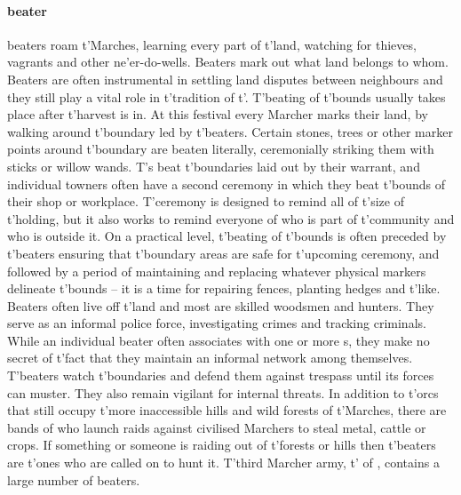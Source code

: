\paragraph{beater} beaters roam t'\allowbreak Marches, learning every part of t'\allowbreak land, watching for thieves, vagrants and other ne'er-do-wells. Beaters mark out what land belongs to whom.  Beaters are often instrumental in settling land disputes between neighbours and they still play a vital role in t'\allowbreak tradition of t'\allowbreak {}. T'beating of t'\allowbreak bounds usually takes place after t'\allowbreak harvest is in. At this festival every Marcher marks their land, by walking around t'\allowbreak boundary led by t'\allowbreak beaters. Certain stones, trees or other marker points around t'\allowbreak boundary are beaten literally, ceremonially striking them with sticks or willow wands. T's beat t'\allowbreak boundaries laid out by their warrant, and individual towners often have a second ceremony in which they beat t'\allowbreak bounds of their shop or workplace. T'ceremony is designed to remind all of t'\allowbreak size of t'\allowbreak holding, but it also works to remind everyone of who is part of t'\allowbreak community and who is outside it. On a practical level, t'\allowbreak beating of t'\allowbreak bounds is often preceded by t'\allowbreak beaters ensuring that t'\allowbreak boundary areas are safe for t'\allowbreak upcoming ceremony, and followed by a period of maintaining and replacing whatever physical markers delineate t'\allowbreak bounds – it is a time for repairing fences, planting hedges and t'\allowbreak like. Beaters often live off t'\allowbreak land and most are skilled woodsmen and hunters. They serve as an informal police force, investigating crimes and tracking criminals. While an individual beater often associates with one or more s, they make no secret of t'\allowbreak fact that they maintain an informal network among themselves. T'beaters watch t'\allowbreak boundaries and defend them against trespass until its forces can muster. They also remain vigilant for internal threats. In addition to t'\allowbreak orcs that still occupy t'\allowbreak more inaccessible hills and wild forests of t'\allowbreak Marches, there are bands of  who launch raids against civilised Marchers to steal metal, cattle or crops. If something or someone is raiding out of t'\allowbreak forests or hills then t'\allowbreak beaters are t'\allowbreak ones who are called on to hunt it. T'third Marcher army, t'\allowbreak {} of , contains a large number of beaters.
